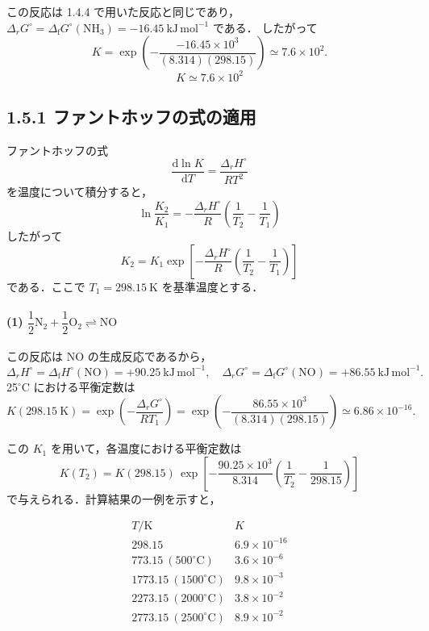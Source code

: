 \documentclass[a4paper,12pt]{jlreq}
\begin{document}
この反応は 1.4.4 で用いた反応と同じであり，
\(\Delta_r G^\circ = \Delta_{\mathrm f}G^\circ(\mathrm{NH_3}) = -16.45\ \mathrm{kJ\,mol^{-1}}\) である．
したがって
\[
 K
 = \exp\left(-\frac{-16.45\times10^3}{(8.314)(298.15)}\right)
 \simeq 7.6\times10^{2}.
\]
\[
 \boxed{K \simeq 7.6\times10^{2}}
\]


\subsection*{1.5.1 ファントホッフの式の適用}

ファントホッフの式
\[
 \frac{\mathrm d\ln K}{\mathrm dT} = \frac{\Delta_r H^\circ}{RT^2}
\]
を温度について積分すると，
\[
 \ln\frac{K_2}{K_1}
 = -\frac{\Delta_r H^\circ}{R}\left(\frac{1}{T_2}-\frac{1}{T_1}\right)
\]
したがって
\[
 K_2
 = K_1 \exp\left[
        -\frac{\Delta_r H^\circ}{R}
         \left(\frac{1}{T_2}-\frac{1}{T_1}\right)
       \right]
\]
である．ここで \(T_1=298.15\ \mathrm{K}\) を基準温度とする．

\paragraph{(1) \(\dfrac12\mathrm{N_2} + \dfrac12\mathrm{O_2} \rightleftharpoons \mathrm{NO}\)}

この反応は NO の生成反応であるから，
\[
 \Delta_r H^\circ = \Delta_{\mathrm f}H^\circ(\mathrm{NO})
  = +90.25\ \mathrm{kJ\,mol^{-1}},
\quad
 \Delta_r G^\circ = \Delta_{\mathrm f}G^\circ(\mathrm{NO})
  = +86.55\ \mathrm{kJ\,mol^{-1}}.
\]
25\(^\circ\mathrm{C}\) における平衡定数は
\[
 K(298.15\ \mathrm{K})
 = \exp\left(-\frac{\Delta_r G^\circ}{RT_1}\right)
 = \exp\left(-\frac{86.55\times10^3}{(8.314)(298.15)}\right)
 \simeq 6.86\times10^{-16}.
\]

この \(K_1\) を用いて，各温度における平衡定数は
\[
 K(T_2)
 = K(298.15)\,
   \exp\left[
     -\frac{90.25\times10^3}{8.314}
      \left(\frac{1}{T_2}-\frac{1}{298.15}\right)
   \right]
\]
で与えられる．計算結果の一例を示すと，

\[
\begin{array}{c|c}
 T / \mathrm{K} & K \\
\hline
298.15 & 6.9\times10^{-16} \\
773.15\ (500^\circ\mathrm{C}) & 3.6\times10^{-6} \\
1773.15\ (1500^\circ\mathrm{C}) & 9.8\times10^{-3} \\
2273.15\ (2000^\circ\mathrm{C}) & 3.8\times10^{-2} \\
2773.15\ (2500^\circ\mathrm{C}) & 8.9\times10^{-2}
\end{array}
\]
\end{document}
